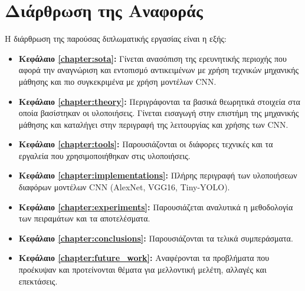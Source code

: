 \section{Διάρθρωση της Αναφοράς}
\label{section:layout}

Η διάρθρωση της παρούσας διπλωματικής εργασίας είναι η εξής:

\begin{itemize}
  \item{\textbf{Κεφάλαιο \ref{chapter:sota}:}
      Γίνεται ανασόπιση της ερευνητικής περιοχής που αφορά την αναγνώριση και εντοπισμό αντικειμένων με χρήση τεχνικών μηχανικής μάθησης και πιο συγκεκριμένα με χρήση μοντέλων CNN.
    }
  \item{\textbf{Κεφάλαιο \ref{chapter:theory}:} Περιγράφονται τα βασικά θεωρητικά στοιχεία
      στα οποία βασίστηκαν οι υλοποιήσεις. Γίνεται εισαγωγή στην επιστήμη
      της μηχανικής μάθησης και καταλήγει στην περιγραφή της λειτουργίας
      και χρήσης των CNN.
    }
  \item{\textbf{Κεφάλαιο \ref{chapter:tools}:} Παρουσιάζονται οι
      διάφορες τεχνικές και τα εργαλεία που χρησιμοποιήθηκαν στις
      υλοποιήσεις.
    }
  \item{\textbf{Κεφάλαιο \ref{chapter:implementations}:} Πλήρης περιγραφή των υλοποιήσεων
      διαφόρων μοντέλων CNN (AlexNet, VGG16, Tiny-YOLO).
    }
  \item{\textbf{Κεφάλαιο \ref{chapter:experiments}:} Παρουσιάζεται αναλυτικά η μεθοδολογία των
      πειραμάτων και τα αποτελέσματα.
    }
  \item{\textbf{Κεφάλαιο \ref{chapter:conclusions}:} Παρουσιάζονται τα τελικά συμπεράσματα.
    }
  \item{\textbf{Κεφάλαιο \ref{chapter:future_work}:} Αναφέρονται τα
      προβλήματα που προέκυψαν και προτείνονται θέματα για μελλοντική
      μελέτη, αλλαγές και επεκτάσεις.
    }
\end{itemize}

